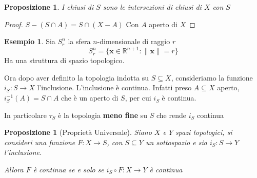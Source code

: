 \documentclass{article}
\newcounter{theo}[section]\setcounter{theo}{0}
\newcounter{excounter}[section]\setcounter{excounter}{0}
\theoremstyle{plain}
\newtheorem{proposition}[theo]{Proposizione}
\theoremstyle{definition}
\newtheorem{example}[excounter]{Esempio}
\theoremstyle{remark}
\begin{document}
\begin{proposition}
    I chiusi di \(S\) sono le intersezioni di chiusi di \(X\) con \(S\) 
\end{proposition}
\begin{proof}
    \(S - (S \cap A) = S \cap  (X - A)\) 
    Con \(A\) aperto di \(X\) 
\end{proof}
\begin{example}
    Sia \(S_r^{n}\) la sfera \(n\)-dimensionale  di raggio \(r\) 
    \[
        S_r^{n} = \{\mathbf{x} \in \mathbb{R}^{n+1} : \|\mathbf{x}\| = r\}   
    \]
    Ha una struttura di spazio topologico.
\end{example}

Ora dopo aver definito la topologia indotta su \(S \subseteq X\), consideriamo
la funzione \(i_S : S \to  X\) l'inclusione. L'inclusione è continua. Infatti
preso \(A \subseteq  X\) aperto, \(i_S^{-1}(A) = S \cap  A\) che è un aperto
di \(S\), per cui \(i_S\) è continua.

In particolare \(\tau_S\) è la topologia \textbf{meno fine} su \(S\) che rende
\(i_S\) continua

\begin{proposition}[Proprietà Universale]
    Siano \(X\) e \(Y\) spazi topologici, si consideri una funzione \(F : X \to
    S\), con \(S \subseteq Y \) un sottospazio e sia \(i_S : S \to Y\) l'inclusione.

    Allora \(F\) è continua se e solo se \(i_S \circ F : X \to  Y\) è continua
\end{proposition}
\end{document}
